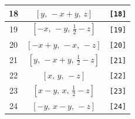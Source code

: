 \documentclass[fleqn,8pt]{jsarticle}
\begin{document}
\begin{longtable}{ccc}
18 & $\left[ y,\, - x + y,\, z \right]$ & {\tt [18]} \\ \hline
19 & $\left[ - x,\, - y,\, \frac{1}{2} - z \right]$ & {\tt [19]} \\ \hline
20 & $\left[ - x + y,\, - x,\, - z \right]$ & {\tt [20]} \\ \hline
21 & $\left[ y,\, - x + y,\, \frac{1}{2} - z \right]$ & {\tt [21]} \\ \hline
22 & $\left[ x,\, y,\, - z \right]$ & {\tt [22]} \\ \hline
23 & $\left[ x - y,\, x,\, \frac{1}{2} - z \right]$ & {\tt [23]} \\ \hline
24 & $\left[ - y,\, x - y,\, - z \right]$ & {\tt [24]} \\
\end{longtable}
\end{document}
